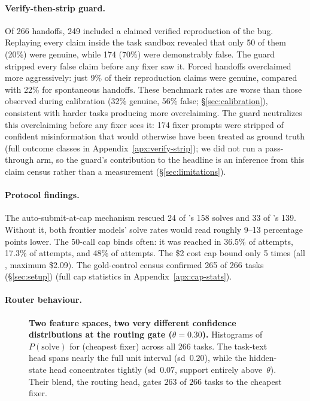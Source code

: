 \paragraph{Verify-then-strip guard.}
Of 266 handoffs, 249 included a claimed verified reproduction of the
bug.  Replaying every claim inside the task sandbox revealed that only
50 of them (20\%) were genuine, while 174 (70\%) were demonstrably
false.  The guard stripped every false claim before any fixer saw it.
Forced handoffs overclaimed more aggressively: just 9\% of their
reproduction claims were genuine, compared with 22\% for spontaneous
handoffs.
These benchmark rates are worse than those observed during calibration
(32\% genuine, 56\% false; \S\ref{sec:calibration}), consistent with
harder tasks producing more overclaiming.
The guard neutralizes this overclaiming before any fixer sees it: 174
fixer prompts were stripped of confident misinformation that would
otherwise have been treated as ground truth (full outcome classes in
Appendix~\ref{apx:verify-strip}); we did not run a pass-through arm, so
the guard's contribution to the headline is an inference from this
claim census rather than a measurement (\S\ref{sec:limitations}).

\paragraph{Protocol findings.}
The auto-submit-at-cap mechanism rescued 24 of \fxopus's 158 solves and
33 of \fxgpt's 139.  Without it, both frontier models' solve rates would read
roughly 9--13 percentage points lower.
The 50-call cap binds often: it was reached in 36.5\% of \fxgpt
attempts, 17.3\% of \fxopus attempts, and 48\% of \fxkimi attempts.
The \$2 cost cap bound only 5 times (all \fxopus, maximum \$2.09).
The gold-control census confirmed 265 of 266 tasks
(\S\ref{sec:setup}) (full cap statistics in Appendix~\ref{apx:cap-stats}).

\paragraph{Router behaviour.}

\begin{figure}[!tbp]
\centering

\caption{\textbf{Two feature spaces, two very different confidence
distributions at the routing gate ($\theta{=}0.30$).}  Histograms of
$P(\text{solve})$ for \fxkimi (cheapest fixer) across all $266$ tasks.
The task-text head spans nearly the full unit interval (sd~$0.20$),
while the hidden-state head concentrates tightly (sd~$0.07$, support
entirely above~$\theta$).  Their blend, the routing head, gates $263$ of
$266$ tasks to the cheapest fixer.}
\label{fig:gate-probability}
\end{figure}

